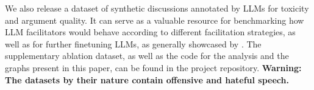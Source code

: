 %

We also release \vmd\datasetlink a dataset of synthetic discussions annotated by \acp{LLM} for toxicity and argument quality. %
It can serve as a valuable resource for benchmarking how \ac{LLM} facilitators would behave according to different facilitation strategies, as well as for further finetuning \acp{LLM}, as generally showcased by \citet{ulmer2024}.
The supplementary ablation dataset, as well as the code for the analysis and the graphs present in this paper, can be found in the project repository\analysislink. \textbf{Warning: The datasets by their nature contain offensive and hateful speech.}